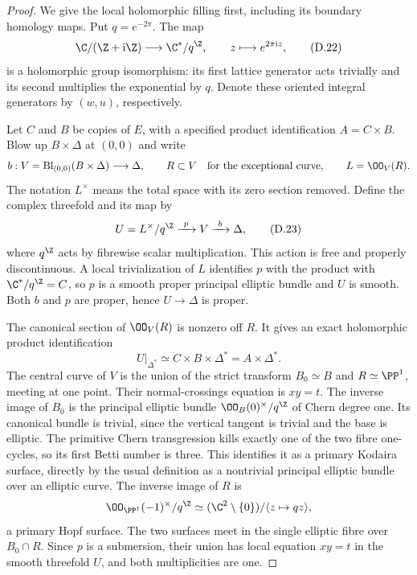 \begin{proof}
We give the local holomorphic filling first, including its
boundary homology maps. Put $q=e^{-2\pi}$. The map
\[
 \C/(\Z+\mathrm i\Z)\longrightarrow\C^*/q^{\Z},
 \qquad z\longmapsto e^{2\pi\mathrm i z},
\tag{D.22}\label{cdp:eq:D.22}
\]
is a holomorphic group isomorphism: its first lattice generator
acts trivially and its second multiplies the exponential by
$q$. Denote these oriented integral generators by $(w,u)$,
respectively.

Let $C$ and $B$ be copies of $E$, with a specified product
identification $A=C\times B$. Blow up $B\times\Delta$ at
$(0,0)$ and write
\[
 b:V=\operatorname{Bl}_{(0,0)}(B\times\Delta)\longrightarrow\Delta,
 \qquad R\subset V\quad\hbox{for the exceptional curve},
 \qquad L=\OO_V(R).
\]
The notation $L^\times$ means the total space with its zero
section removed. Define the complex threefold and its map by
\[
 U=L^\times/q^{\Z}\xrightarrow{\ p\ }V\xrightarrow{\ b\ }\Delta,
\tag{D.23}\label{cdp:eq:D.23}
\]
where $q^{\Z}$ acts by fibrewise scalar multiplication. This
action is free and properly discontinuous. A local
trivialization of $L$ identifies $p$ with the product with
$\C^*/q^{\Z}=C$, so $p$ is a smooth proper principal elliptic
bundle and $U$ is smooth. Both $b$ and $p$ are proper, hence
$U\to\Delta$ is proper.

The canonical section of $\OO_V(R)$ is nonzero off $R$.
It gives an exact holomorphic product identification
\[
 U|_{\Delta^*}\simeq C\times B\times\Delta^*
                         =A\times\Delta^*.
\tag{D.24}\label{cdp:eq:D.24}
\]
The central curve of $V$ is the union of the strict transform
$B_0\simeq B$ and $R\simeq\PP^1$, meeting at one point.
Their normal-crossings equation is $xy=t$. The inverse image
of $B_0$ is the principal elliptic bundle
$\OO_B(0)^\times/q^{\Z}$ of Chern degree one. Its canonical
bundle is trivial, since the vertical tangent is trivial and
the base is elliptic. The primitive Chern transgression
kills exactly one of the two fibre one-cycles, so its first
Betti number is three. This identifies it as a primary
Kodaira surface, directly by the usual definition as a
nontrivial principal elliptic bundle over an elliptic curve.
The inverse image of $R$ is
\[
 \OO_{\PP^1}(-1)^\times/q^{\Z}
       \simeq(\C^2\setminus\{0\})/\langle z\mapsto qz\rangle,
\]
a primary Hopf surface. The two surfaces meet in the single
elliptic fibre over $B_0\cap R$. Since $p$ is a submersion,
their union has local equation $xy=t$ in the smooth
threefold $U$, and both multiplicities are one.


\end{proof}
